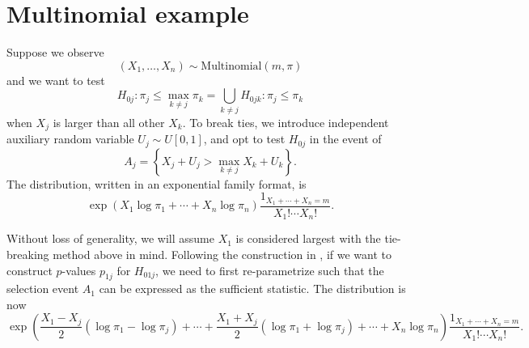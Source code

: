 \documentclass[11pt]{article}
\begin{document}
\section{Multinomial example}
\label{sec:multinomial_example}

Suppose we observe
$$\left(X_1, \ldots, X_n\right) \sim \text{Multinomial}\left(m, \pi\right)$$
and we want to test
$$H_{0j}: \pi_j \le \max_{k \ne j} \pi_k = \bigcup_{k \ne j} H_{0jk}: \pi_j \le \pi_k$$
when $X_j$ is larger than all other $X_k$. To break ties, we introduce independent auxiliary random variable $U_j \sim U\left[0,1\right]$, and opt to test $H_{0j}$ in the event of
$$A_j = \left\{X_j + U_j > \max_{k \ne j} X_k + U_k\right\}.$$
The distribution, written in an exponential family format, is
$$\exp\left(X_1 \log \pi_1 + \cdots + X_n \log \pi_n\right) \frac{1_{X_1 + \cdots + X_n = m}}{X_1! \cdots X_n!}.$$

Without loss of generality, we will assume $X_1$ is considered largest with the tie-breaking method above in mind. Following the construction in \cite{Fithian:2014ws}, if we want to construct $p$-values $p_{1j}$ for $H_{01j}$, we need to first re-parametrize such that the selection event $A_1$ can be expressed as the sufficient statistic. The distribution is now
$$\exp\left(\frac{X_1 - X_j}{2} \left(\log \pi_1 - \log \pi_j\right) + \cdots + \frac{X_1 + X_j}{2} \left(\log \pi_1 + \log \pi_j\right) + \cdots + X_n \log \pi_n\right) \frac{1_{X_1 + \cdots + X_n = m}}{X_1! \cdots X_n!}.$$
\end{document}
